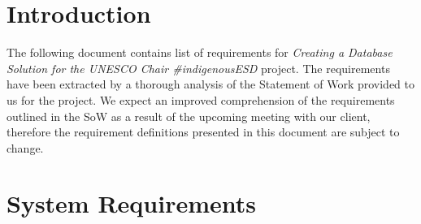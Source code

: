 \documentclass[11pt]{article}
\begin{document}

\maketitle %

\thispagestyle{empty} %

\newpage
\tableofcontents
\newpage


\section{Introduction}

The following document contains list of requirements for \textit{Creating a Database Solution for the UNESCO Chair #indigenousESD} project. The requirements have been extracted by a thorough analysis of the Statement of Work provided to us for the project. We expect an improved comprehension of the requirements outlined in the SoW as a result of the upcoming meeting with our client, therefore the requirement definitions presented in this document are subject to change.

\section{System Requirements}
\end{document}
